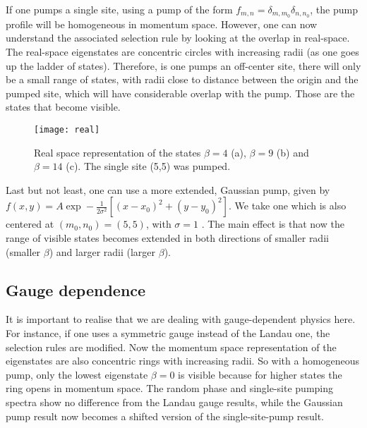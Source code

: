\documentclass[twocolumn, 10pt, aps, superscriptaddress, floatfix, showpacs, prb, citeautoscript]{revtex4-1}
\newcommand{\co}[2]{#2}
\renewcommand{\paragraph}{\co}
\begin{document}
\paragraph{$\delta$-like pump}
If one pumps a single site, using a pump of the form $f_{m,n} =
\delta_{m,m_0} \delta_{n,n_0}$, the pump profile will be homogeneous
in momentum space.  However, one can now understand the associated
selection rule by looking at the overlap in real-space. The real-space
eigenstates are concentric circles with increasing radii (as one goes
up the ladder of states). Therefore, is one pumps an off-center site,
there will only be a small range of states, with radii close to
distance between the origin and the pumped site, which will have
considerable overlap with the pump. Those are the states that become
visible.

\begin{figure}[htb]
  \centerline{\texttt{[image: real]}}
  \caption{Real space representation of the states $\beta=4$ (a), $\beta=9$ (b) and $\beta=14$ (c). The single site (5,5) was pumped.}
  \label{fig:delta_real_sp}
\end{figure}


\paragraph{Gaussian pump}
Last but not least, one can use a more extended, Gaussian pump, given
by \(f(x,y) = A \exp- \frac{1}{2\sigma^2} \left[(x-x_0)^2 + (y-y_0)^2
\right]\). We take one which is also centered at \((m_0,n_0) = (5,5)\),
with \(\sigma =1\) . The main effect is that now the range of visible
states becomes extended in both directions of smaller radii (smaller
\(\beta\)) and larger radii (larger \(\beta\)).

\subsection{Gauge dependence}
\label{sec:gauge}
It is important to realise that we are dealing with gauge-dependent
physics here. For instance, if one uses a symmetric gauge instead of
the Landau one, the selection rules are modified. Now the momentum
space representation of the eigenstates are also concentric rings with
increasing radii. So with a homogeneous pump, only the lowest
eigenstate $\beta=0$ is visible because for higher states the ring
opens in momentum space. The random phase and single-site pumping
spectra show no difference from the Landau gauge results, while the
Gaussian pump result now becomes a shifted version of the
single-site-pump result.
\end{document}
